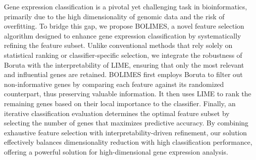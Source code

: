 Gene expression classification is a pivotal yet challenging task in bioinformatics, primarily due to the high dimensionality of genomic data and the risk of overfitting. To bridge this gap, we propose BOLIMES, a novel feature selection algorithm designed to enhance gene expression classification by systematically refining the feature subset. Unlike conventional methods that rely solely on statistical ranking or classifier-specific selection, we integrate the robustness of Boruta with the interpretability of LIME, ensuring that only the most relevant and influential genes are retained. BOLIMES first employs Boruta to filter out non-informative genes by comparing each feature against its randomized counterpart, thus preserving valuable information. It then uses LIME to rank the remaining genes based on their local importance to the classifier. Finally, an iterative classification evaluation determines the optimal feature subset by selecting the number of genes that maximizes predictive accuracy. By combining exhaustive feature selection with interpretability-driven refinement, our solution effectively balances dimensionality reduction with high classification performance, offering a powerful solution for high-dimensional gene expression analysis.


